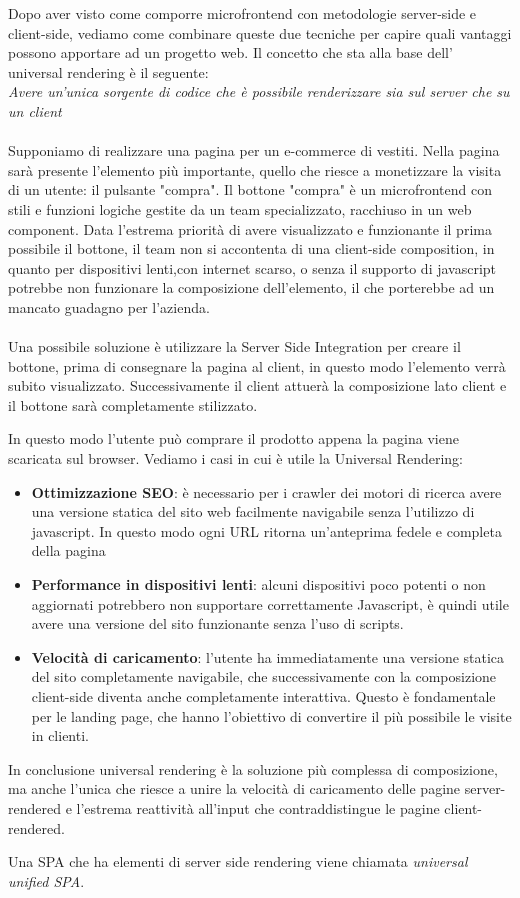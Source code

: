 Dopo aver visto come comporre microfrontend con metodologie server-side e client-side, vediamo come combinare queste due tecniche
per capire quali vantaggi possono apportare ad un progetto web.
Il concetto che sta alla base dell' universal rendering è il seguente:\\
\emph{Avere un'unica sorgente di codice che è possibile renderizzare sia sul server che su un client} \cite{ssr}
\\\\
Supponiamo di realizzare una pagina per un e-commerce di vestiti.
Nella pagina sarà presente l'elemento più importante, quello che riesce a monetizzare la visita di un utente: il pulsante "compra".
Il bottone "compra" è un microfrontend con stili e funzioni logiche gestite da un team specializzato, racchiuso in un web component.
Data l'estrema priorità di avere visualizzato e funzionante il prima possibile il bottone, il team non si accontenta di una client-side composition,
in quanto per dispositivi lenti,con internet scarso, o senza il supporto di javascript potrebbe non funzionare la composizione dell'elemento, 
il che porterebbe ad un mancato guadagno per l'azienda.
\\\\
Una possibile soluzione è utilizzare la Server Side Integration per creare il bottone, prima di consegnare la pagina al client, in questo modo l'elemento 
verrà subito visualizzato. Successivamente il client attuerà la composizione lato client e il bottone sarà completamente stilizzato.

In questo modo l'utente può comprare il prodotto appena la pagina viene scaricata sul browser.
\pagebreak
Vediamo i casi in cui è utile la Universal Rendering: \cite{angularUniversal}
\begin{itemize}
    \item \textbf{Ottimizzazione SEO}: è necessario per i crawler dei motori di ricerca avere una versione statica del sito web
    facilmente navigabile senza l'utilizzo di javascript. In questo modo ogni URL ritorna un'anteprima fedele e completa della pagina
    \item \textbf{Performance in dispositivi lenti}: alcuni dispositivi poco potenti o non aggiornati potrebbero non supportare correttamente
    Javascript, è quindi utile avere una versione del sito funzionante senza l'uso di scripts.
    \item \textbf{Velocità di caricamento}: l'utente ha immediatamente una versione statica del sito completamente navigabile, che successivamente
    con la composizione client-side diventa anche completamente interattiva. Questo è fondamentale per le landing page, che hanno l'obiettivo di convertire il più 
    possibile le visite in clienti.
\end{itemize}

In conclusione universal rendering è la soluzione più complessa di composizione,
 ma anche l'unica che riesce a unire la velocità di caricamento delle pagine server-rendered
e l'estrema reattività all'input che contraddistingue le pagine client-rendered.

Una SPA che ha elementi di server side rendering viene chiamata \emph{universal unified SPA}.

